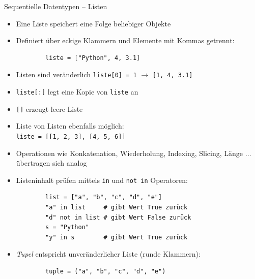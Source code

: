 \documentclass[utf8, smaller, c]{beamer}
\renewcommand{\tt}[1]{{\texttt{#1}}}
\begin{document}
\begin{frame}{Sequentielle Datentypen -- Listen}
	\begin{itemize}
		\item Eine Liste speichert eine Folge beliebiger Objekte
		\item Definiert über eckige Klammern und Elemente mit Kommas getrennt:
		\begin{verbatim}
		liste = ["Python", 4, 3.1]
		\end{verbatim}
		\item Listen sind veränderlich\newline
		\verb|liste[0] = 1| $\rightarrow$ \verb|[1, 4, 3.1]|
		\item \verb+liste[:]+ legt eine Kopie von \verb|liste| an
		\item \verb|[]| erzeugt leere Liste
		\item Liste von Listen ebenfalls möglich: \\ \verb|liste = [[1, 2, 3], [4, 5, 6]]|
	\end{itemize}

	\framebreak
	
	\vspace*{-2mm}
	\begin{itemize}
		\item Operationen wie Konkatenation, Wiederholung, Indexing, Slicing, Länge $\dots$ übertragen sich analog
	 	\item Listeninhalt prüfen mittels \tt{in} und \tt{not in} Operatoren:
	 	\begin{verbatim}
	 	list = ["a", "b", "c", "d", "e"]
	 	"a" in list     # gibt Wert True zurück
	 	"d" not in list # gibt Wert False zurück
	 	s = "Python"
	 	"y" in s        # gibt Wert True zurück
	 	\end{verbatim}
	 	\vspace{-5mm}
	 	\item \textit{Tupel} entspricht unveränderlicher Liste (runde Klammern):
	 	\begin{verbatim}
	 	tuple = ("a", "b", "c", "d", "e")
		\end{verbatim}
	\end{itemize}

	\framebreak	
	

\end{frame}
\end{document}
